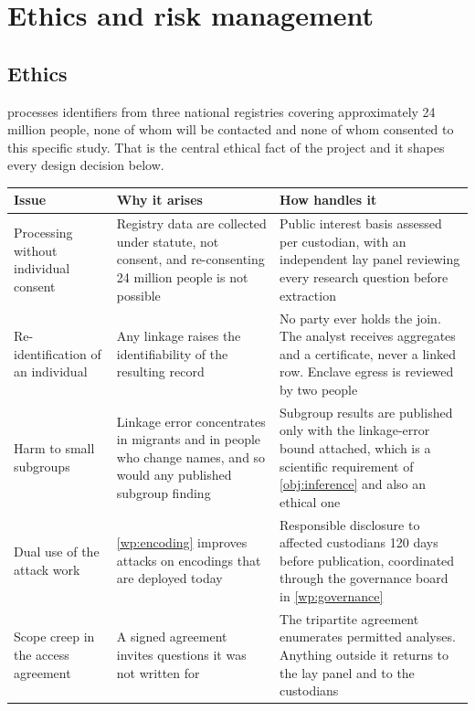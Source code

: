 \section{Ethics and risk management}
\label{sec:risk}

\subsection{Ethics}

\proj{} processes identifiers from three national registries covering approximately 24 million
people, none of whom will be contacted and none of whom consented to this specific study. That is
the central ethical fact of the project and it shapes every design decision below.

\begin{center}
\small
\begin{tabular}{@{}L{3.5cm} L{5.3cm} L{6.0cm}@{}}
  \toprule
  Issue & Why it arises & How \proj{} handles it \\
  \midrule
  Processing without individual consent &
  Registry data are collected under statute, not consent, and re-consenting 24 million people is
  not possible &
  Public interest basis assessed per custodian, with an independent lay panel reviewing every
  research question before extraction \\
  \addlinespace
  Re-identification of an individual &
  Any linkage raises the identifiability of the resulting record &
  No party ever holds the join. The analyst receives aggregates and a certificate, never a linked
  row. Enclave egress is reviewed by two people \\
  \addlinespace
  Harm to small subgroups &
  Linkage error concentrates in migrants and in people who change names, and so would any published
  subgroup finding &
  Subgroup results are published only with the linkage-error bound attached, which is a scientific
  requirement of \ref{obj:inference} and also an ethical one \\
  \addlinespace
  Dual use of the attack work &
  \ref{wp:encoding} improves attacks on encodings that are deployed today &
  Responsible disclosure to affected custodians 120 days before publication, coordinated through
  the governance board in \ref{wp:governance} \\
  \addlinespace
  Scope creep in the access agreement &
  A signed agreement invites questions it was not written for &
  The tripartite agreement enumerates permitted analyses. Anything outside it returns to the lay
  panel and to the custodians \\
  \bottomrule
\end{tabular}
\end{center}


